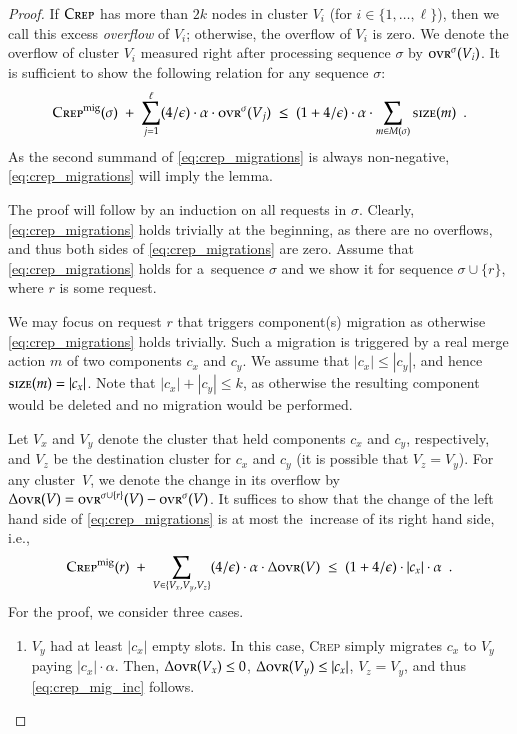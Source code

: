 \documentclass[11pt,a4paper]{scrartcl}
\newcommand{\CREP}{\textsc{Crep}\xspace}
\newcommand{\CREPmig}{\CREP^\textnormal{mig}}
\newcommand{\ovr}{\textsc{ovr}}
\newcommand{\eps}{\ensuremath{\epsilon}}
\newcommand{\size}{\textsc{size}}
\begin{document}
\begin{proof}
If $\CREP$ has more than $2 k$ nodes in cluster $V_i$ (for $i \in
\{1,\ldots,\ell\}$), then we call this excess \emph{overflow} of $V_i$;
otherwise, the overflow of $V_i$ is zero. We denote the overflow of cluster
$V_i$ measured right after processing sequence $\sigma$ by $\ovr^\sigma(V_i)$.
It is sufficient to show the following relation for any sequence $\sigma$:
\begin{equation}
\label{eq:crep_migrations}
 \CREPmig(\sigma) \;+\; \sum_{j=1}^\ell (4/\eps) \cdot \alpha \cdot \ovr^\sigma(V_j) 
 \; \leq \; (1+4/\eps)  \cdot \alpha \cdot \sum_{m \in M(\sigma)} \size(m) 
\enspace.
\end{equation}
As the second summand of \eqref{eq:crep_migrations} is always non-negative,
\eqref{eq:crep_migrations} will imply the lemma. 

The proof will follow by an induction on all requests in $\sigma$. Clearly,
\eqref{eq:crep_migrations} holds trivially at the beginning, as there are no
overflows, and thus both sides of \eqref{eq:crep_migrations} are zero.
Assume that \eqref{eq:crep_migrations} holds for a~sequence $\sigma$
and we show it for sequence $\sigma \cup \{ r \}$, where $r$ is some request.

We may focus on request $r$ that triggers component(s) migration as otherwise
\eqref{eq:crep_migrations} holds trivially. Such a migration is triggered by a
real merge action $m$ of two components $c_x$ and $c_y$. We assume that $|c_x|
\leq |c_y|$, and hence $\size(m) = |c_x|$. Note that $|c_x| + |c_y| \leq k$,
as otherwise the resulting component would be deleted and no migration would
be performed.

Let $V_x$ and $V_y$ denote the cluster that held components $c_x$ and $c_y$,
respectively, and $V_z$ be the destination cluster for $c_x$ and $c_y$ (it is
possible that $V_z = V_y$). For any cluster~$V$, we denote the change in 
its overflow by $\Delta \ovr(V) = \ovr^{\sigma \cup \{r\}}(V) - \ovr^\sigma(V)$. 
It suffices to show that the
change of the left hand side of \eqref{eq:crep_migrations} is at most
the~increase of its right hand side, i.e.,
\begin{equation}
\label{eq:crep_mig_inc}
\CREPmig(r) \;+\; \sum_{V \in \{ V_x, V_y, V_z \}} (4/\eps) \cdot \alpha \cdot \Delta\ovr(V) 
\;\leq\; (1+4/\eps) \cdot |c_x| \cdot \alpha
\enspace.
\end{equation}
For the proof, we consider three cases.

\begin{enumerate}
\item 
$V_y$ had at least $|c_x|$ empty slots. In this case, \CREP simply migrates
$c_x$ to $V_y$ paying $|c_x| \cdot \alpha$. Then, $\Delta \ovr(V_x) \leq 0$,
$\Delta \ovr(V_y) \leq |c_x|$, $V_z = V_y$, and thus \eqref{eq:crep_mig_inc}
follows.


\end{enumerate}
\end{proof}
\end{document}
